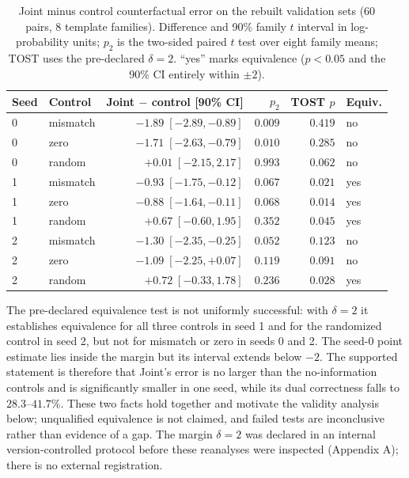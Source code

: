 \documentclass[11pt,a4paper]{article}
\begin{document}
\begin{table}[t]
\centering
\caption{Joint minus control counterfactual error on the rebuilt validation
sets (60 pairs, 8 template families). Difference and 90\% family $t$ interval
in log-probability units; $p_2$ is the two-sided paired $t$ test over eight
family means; TOST uses the pre-declared $\delta=2$. ``yes'' marks equivalence
($p<0.05$ and the 90\% CI entirely within $\pm2$).}
\label{tab:controltest}
\begin{tabular}{llrrrl}
\toprule
Seed & Control & Joint $-$ control [90\% CI] & $p_2$ & TOST $p$ & Equiv. \\
\midrule
0 & mismatch & $-1.89\;[-2.89,-0.89]$ & $0.009$ & $0.419$ & no \\
0 & zero     & $-1.71\;[-2.63,-0.79]$ & $0.010$ & $0.285$ & no \\
0 & random   & $+0.01\;[-2.15, 2.17]$ & $0.993$ & $0.062$ & no \\
1 & mismatch & $-0.93\;[-1.75,-0.12]$ & $0.067$ & $0.021$ & yes \\
1 & zero     & $-0.88\;[-1.64,-0.11]$ & $0.068$ & $0.014$ & yes \\
1 & random   & $+0.67\;[-0.60, 1.95]$ & $0.352$ & $0.045$ & yes \\
2 & mismatch & $-1.30\;[-2.35,-0.25]$ & $0.052$ & $0.123$ & no \\
2 & zero     & $-1.09\;[-2.25,+0.07]$ & $0.119$ & $0.091$ & no \\
2 & random   & $+0.72\;[-0.33, 1.78]$ & $0.236$ & $0.028$ & yes \\
\bottomrule
\end{tabular}
\end{table}

The pre-declared equivalence test is not uniformly successful: with
$\delta=2$ it establishes equivalence for all three controls in seed 1 and for
the randomized control in seed 2, but not for mismatch or zero in seeds 0 and
2. The seed-0 point estimate lies inside the margin but its interval extends
below $-2$. The supported statement is therefore that Joint's error is no
larger than the no-information controls and is significantly smaller in one
seed, while its dual correctness falls to $28.3$--$41.7\%$. These two facts hold
together and motivate the validity analysis below; unqualified equivalence is
not claimed, and failed tests are inconclusive rather than evidence of a gap.
The margin $\delta=2$ was declared in an internal version-controlled protocol
before these reanalyses were inspected (Appendix A); there is no external
registration.
\end{document}
